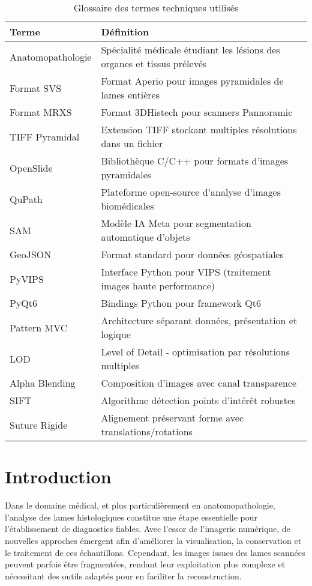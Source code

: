 \documentclass[12pt,a4paper]{report}
\begin{document}
\begin{table}[h!]
\centering
\footnotesize
\begin{tabular}{|p{3.5cm}|p{9cm}|}
\hline
\rowcolor{LightGray}
\textbf{Terme} & \textbf{Définition} \\
\hline
Anatomopathologie & Spécialité médicale étudiant les lésions des organes et tissus prélevés \\
\hline
Format SVS & Format Aperio pour images pyramidales de lames entières \\
\hline
Format MRXS & Format 3DHistech pour scanners Pannoramic \\
\hline
TIFF Pyramidal & Extension TIFF stockant multiples résolutions dans un fichier \\
\hline
OpenSlide & Bibliothèque C/C++ pour formats d'images pyramidales \\
\hline
QuPath & Plateforme open-source d'analyse d'images biomédicales \\
\hline
SAM & Modèle IA Meta pour segmentation automatique d'objets \\
\hline
GeoJSON & Format standard pour données géospatiales \\
\hline
PyVIPS & Interface Python pour VIPS (traitement images haute performance) \\
\hline
PyQt6 & Bindings Python pour framework Qt6 \\
\hline
Pattern MVC & Architecture séparant données, présentation et logique \\
\hline
LOD & Level of Detail - optimisation par résolutions multiples \\
\hline
Alpha Blending & Composition d'images avec canal transparence \\
\hline
SIFT & Algorithme détection points d'intérêt robustes \\
\hline
Suture Rigide & Alignement préservant forme avec translations/rotations \\
\hline
\end{tabular}
\caption{Glossaire des termes techniques utilisés}
\end{table}

\newpage

\chapter{Introduction}

Dans le domaine médical, et plus particulièrement en anatomopathologie, l'analyse des lames histologiques constitue une étape essentielle pour l'établissement de diagnostics fiables. Avec l'essor de l'imagerie numérique, de nouvelles approches émergent afin d'améliorer la visualisation, la conservation et le traitement de ces échantillons. Cependant, les images issues des lames scannées peuvent parfois être fragmentées, rendant leur exploitation plus complexe et nécessitant des outils adaptés pour en faciliter la reconstruction.
\end{document}
